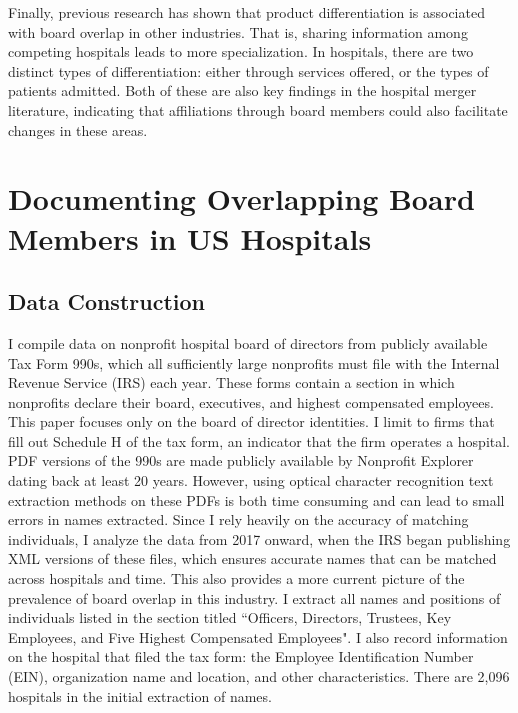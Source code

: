 \documentclass[12pt]{article}
\begin{document}
    Finally, previous research has shown that product differentiation is associated with board overlap in other industries. That is, sharing information among competing hospitals leads to more specialization. In hospitals, there are two distinct types of differentiation: either through services offered, or the types of patients admitted. Both of these are also key findings in the hospital merger literature, indicating that affiliations through board members could also facilitate changes in these areas. 

    


    

    \section{Documenting Overlapping Board Members in US Hospitals}\label{sec:document}

    \subsection{Data Construction}

    
   I compile data on nonprofit hospital board of directors from publicly available Tax Form 990s, which all sufficiently large nonprofits must file with the Internal Revenue Service (IRS) each year. These forms contain a section in which nonprofits declare their board, executives, and highest compensated employees. This paper focuses only on the board of director identities. I limit to firms that fill out Schedule H of the tax form, an indicator that the firm operates a hospital. PDF versions of the 990s are made publicly available by Nonprofit Explorer dating back at least 20 years. However, using optical character recognition text extraction methods on these PDFs is both time consuming and can lead to small errors in names extracted. Since I rely heavily on the accuracy of matching individuals, I analyze the data from 2017 onward, when the IRS began publishing XML versions of these files, which ensures accurate names that can be matched across hospitals and time. This also provides a more current picture of the prevalence of board overlap in this industry. I extract all names and positions of individuals listed in the section titled ``Officers, Directors, Trustees, Key Employees, and Five Highest Compensated Employees". I also record information on the hospital that filed the tax form: the Employee Identification Number (EIN), organization name and location, and other characteristics. There are 2,096 hospitals in the initial extraction of names.
\end{document}
